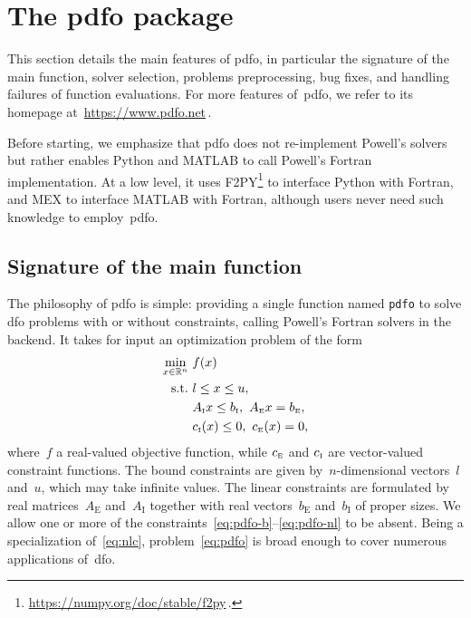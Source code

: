 \documentclass{article}
\numberwithin{equation}{section}
\theoremstyle{definition}
\theoremstyle{plain}
\theoremstyle{remark}
\newcommand*{\R}{\mathbb{R}}
\newcommand{\st}{\text{s.t.}}
\newcommand{\aeq}{A_{\scriptscriptstyle\text{E}}}
\newcommand{\aub}{A_{\scriptscriptstyle\text{I}}}
\newcommand{\beq}{b_{\scriptscriptstyle\text{E}}}
\newcommand{\bub}{b_{\scriptscriptstyle\text{I}}}
\newcommand{\con}[1][i]{c\ifthenelse{\equal{#1}{}}{}{_{#1}}}
\newcommand{\ceq}{\con[\scriptscriptstyle{\text{E}}]}
\newcommand{\cub}{\con[\scriptscriptstyle\text{I}]}
\newcommand{\obj}{f}
\newcommand{\xl}{l}
\newcommand{\xu}{u}
\begin{document}
\section{The \texorpdfstring{\gls{pdfo}}{PDFO} package}
\label{sec:pdfo}

This section details the main features of \gls{pdfo}, in particular the signature of the main function, solver selection, problems preprocessing, bug fixes, and handling failures of function evaluations.
For more features of~\gls{pdfo}, we refer to its homepage at~\url{https://www.pdfo.net}\,.

Before starting, we emphasize that \gls{pdfo} does not re-implement Powell's solvers but rather enables Python and MATLAB to call Powell's Fortran implementation.
At a low level, it uses F2PY\footnote{\url{https://numpy.org/doc/stable/f2py}\,.} to interface Python with Fortran, and MEX to interface MATLAB with Fortran, although users never need such knowledge to employ~\gls{pdfo}.

\subsection{Signature of the main function}

The philosophy of \gls{pdfo} is simple: providing a single function named \texttt{pdfo} to solve \gls{dfo} problems with or without constraints, calling Powell's Fortran solvers in the backend.
It takes for input an optimization problem of the form
\begin{subequations}
    \label{eq:pdfo}
    \begin{align}
        \min_{x \in \R^n}   & ~ \obj(x)\\
        \st                 & ~ \xl \le x \le \xu, \label{eq:pdfo-b}\\
                            & ~ \aub x \le \bub, ~ \aeq x = \beq, \label{eq:pdfo-l}\\
                            & ~ \cub(x) \le 0, ~ \ceq(x) = 0, \label{eq:pdfo-nl}
    \end{align}
\end{subequations}
where~$\obj$ a real-valued objective function, while $\ceq$ and $\cub$ are vector-valued constraint functions.
The bound constraints are given by~$n$-dimensional vectors~$\xl$ and~$\xu$, which may take infinite values.
The linear constraints are formulated by real matrices~$\aeq$ and~$\aub$ together with real vectors~$\beq$ and~$\bub$ of proper sizes.
We allow one or more of the constraints~\eqref{eq:pdfo-b}--\eqref{eq:pdfo-nl} to be absent.
Being a specialization of~\eqref{eq:nlc}, problem~\eqref{eq:pdfo} is broad enough to cover numerous applications of~\gls{dfo}.
\end{document}
